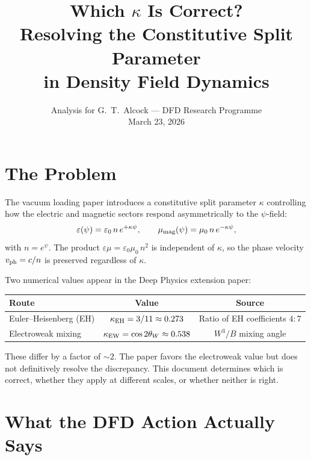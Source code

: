 \documentclass[11pt,a4paper]{article}
\title{Which $\kappa$ Is Correct?\\
Resolving the Constitutive Split Parameter\\
in Density Field Dynamics}
\author{Analysis for G.\ T.\ Alcock --- DFD Research Programme\\
March 23, 2026}
\date{}
\begin{document}
\maketitle

\section{The Problem}

The vacuum loading paper introduces a constitutive split parameter $\kappa$
controlling how the electric and magnetic sectors respond asymmetrically
to the $\psi$-field:
\begin{equation}\label{eq:constitutive}
\varepsilon(\psi) = \varepsilon_0\, n\, e^{+\kappa\psi}, \qquad
\mu_{\rm mag}(\psi) = \mu_0\, n\, e^{-\kappa\psi},
\end{equation}
with $n = e^\psi$.  The product $\varepsilon\mu = \varepsilon_0\mu_0\,n^2$
is independent of $\kappa$, so the phase velocity $v_{\rm ph} = c/n$ is
preserved regardless of $\kappa$.

Two numerical values appear in the Deep Physics extension paper:
\begin{center}
\begin{tabular}{lcc}
\toprule
\textbf{Route} & \textbf{Value} & \textbf{Source} \\
\midrule
Euler--Heisenberg (EH) & $\kappa_{\rm EH} = 3/11 \approx 0.273$ &
Ratio of EH coefficients $4:7$ \\
Electroweak mixing & $\kappa_{\rm EW} = \cos 2\theta_W \approx 0.538$ &
$W^3/B$ mixing angle \\
\bottomrule
\end{tabular}
\end{center}

These differ by a factor of $\sim 2$.  The paper favors the electroweak
value but does not definitively resolve the discrepancy.  This document
determines which is correct, whether they apply at different scales, or
whether neither is right.

\section{What the DFD Action Actually Says}
\label{sec:action}
\end{document}
